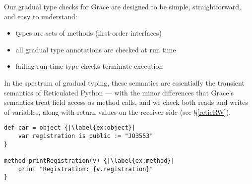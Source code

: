 Our gradual type checks for Grace are designed to be simple,
straightforward, and easy to understand:
\begin{itemize}
  \item types are sets of methods (first-order interfaces)
  \item all gradual type annotations are checked at run time
  \item failing run-time type checks terminate execution
\end{itemize}
%
%
In the spectrum of gradual typing, these semantics are essentially the
transient semantics of Reticulated Python
\cite{reticPython2014,Greenman2018} ---
with the minor differences that Grace's semantics
treat field access as method calls, and we check both reads and
writes of variables, along with return values on the receiver side
(see \S\ref{reticRW}).


\begin{lstlisting}[caption={The start of a simple program for tracking vehicle information.},float,label=lst:car-reg,escapechar=|,columns=flexible,float,floatplacement=H]
def car = object {|\label{ex:object}|
    var registration is public := "JO3553"
}

method printRegistration(v) {|\label{ex:method}|
    print "Registration: {v.registration}"
}
\end{lstlisting}



